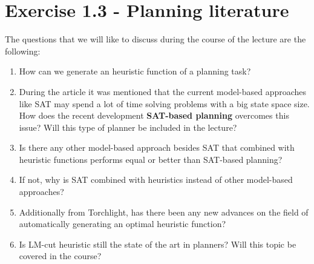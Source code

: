 \documentclass[12pt,a4paper]{article}
\begin{document}
	\section*{Exercise 1.3 - Planning literature}
	The questions that we will like to discuss during the course of the lecture are the following:
	\begin{enumerate}
		\item How can we generate an heuristic function of a planning task?
		\item During the article it was mentioned that the current model-based approaches like SAT may spend a lot of time solving problems with a big state space size. How does the recent development \textbf{SAT-based planning} overcomes this issue? Will this type of planner be included in the lecture?
		\item Is there any other model-based approach besides SAT that combined with heuristic functions performs equal or better than SAT-based planning?
		\item If not, why is SAT combined with heuristics instead of other model-based approaches?
		\item Additionally from Torchlight, has there been any new advances on the field of automatically generating an optimal heuristic function?
		\item Is LM-cut heuristic still the state of the art in planners? Will this topic be covered in the course?
	\end{enumerate}

	
\end{document}
